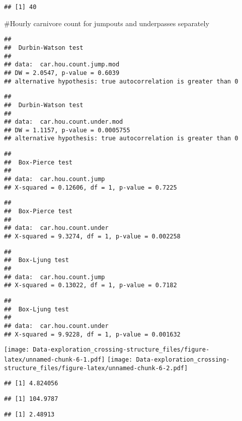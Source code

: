 \documentclass[]{article}
\begin{document}
\begin{verbatim}
## [1] 40
\end{verbatim}

\#Hourly carnivore count for jumpouts and underpasses separately

\begin{verbatim}
## 
##  Durbin-Watson test
## 
## data:  car.hou.count.jump.mod
## DW = 2.0547, p-value = 0.6039
## alternative hypothesis: true autocorrelation is greater than 0
\end{verbatim}

\begin{verbatim}
## 
##  Durbin-Watson test
## 
## data:  car.hou.count.under.mod
## DW = 1.1157, p-value = 0.0005755
## alternative hypothesis: true autocorrelation is greater than 0
\end{verbatim}

\begin{verbatim}
## 
##  Box-Pierce test
## 
## data:  car.hou.count.jump
## X-squared = 0.12606, df = 1, p-value = 0.7225
\end{verbatim}

\begin{verbatim}
## 
##  Box-Pierce test
## 
## data:  car.hou.count.under
## X-squared = 9.3274, df = 1, p-value = 0.002258
\end{verbatim}

\begin{verbatim}
## 
##  Box-Ljung test
## 
## data:  car.hou.count.jump
## X-squared = 0.13022, df = 1, p-value = 0.7182
\end{verbatim}

\begin{verbatim}
## 
##  Box-Ljung test
## 
## data:  car.hou.count.under
## X-squared = 9.9228, df = 1, p-value = 0.001632
\end{verbatim}

\texttt{[image: Data-exploration\_crossing-structure\_files/figure-latex/unnamed-chunk-6-1.pdf]}
\texttt{[image: Data-exploration\_crossing-structure\_files/figure-latex/unnamed-chunk-6-2.pdf]}

\begin{verbatim}
## [1] 4.824056
\end{verbatim}

\begin{verbatim}
## [1] 104.9787
\end{verbatim}

\begin{verbatim}
## [1] 2.48913
\end{verbatim}
\end{document}

